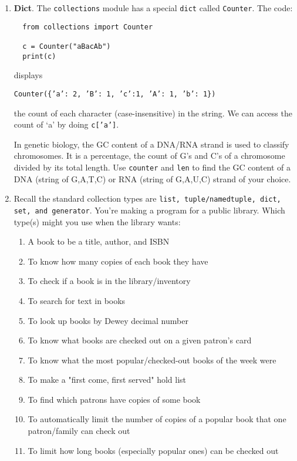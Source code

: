 \documentclass{article}
\begin{document}
\begin{enumerate}
  \item \textbf{Dict}. The \texttt{collections} module has a special \texttt{dict}
  called \texttt{Counter}. The code:
  \begin{lstlisting}
  from collections import Counter

  c = Counter("aBacAb")
  print(c)
  \end{lstlisting}
  displays 
  
  \begin{center}
    \texttt{Counter(\{'a': 2, 'B': 1, 'c':1, 'A': 1, 'b': 1\})}
  \end{center}
  
  the count of each character (case-insensitive) in the string. We can
  access the count of `a' by doing \texttt{c['a']}.

  In genetic biology, the GC content of a DNA/RNA strand is used to classify
  chromosomes. It is a percentage, the count of G's and C's of a chromosome
  divided by its total length. Use \texttt{counter} and \texttt{len} to find
  the GC content of a DNA (string of G,A,T,C) or RNA (string of G,A,U,C) strand
  of your choice.

  \item Recall the standard collection types are \texttt{list,
  tuple/namedtuple, dict, set, and generator}.  You're making a program for a
  public library.  Which type(s) might you use when the library wants:

  \begin{enumerate}
    \item A book to be a title, author, and ISBN
    \item To know how many copies of each book they have
    \item To check if a book is in the library/inventory
    \item To search for text in books
    \item To look up books by Dewey decimal number
    \item To know what books are checked out on a given patron's card
    \item To know what the most popular/checked-out books of the week were
    \item To make a "first come, first served" hold list 
    \item To find which patrons have copies of some book
    \item To automatically limit the number of copies of a popular book 
          that one patron/family can check out
    \item To limit how long books (especially popular ones) can be checked out
  \end{enumerate}


\end{enumerate}
\end{document}
